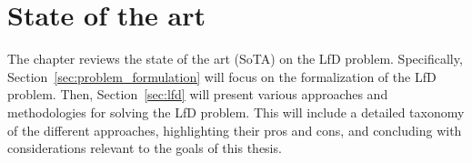 \section{State of the art}
The chapter reviews the state of the art (SoTA) on the LfD problem. Specifically, Section~\ref{sec:problem_formulation} will focus on the formalization of the LfD problem. Then, Section~\ref{sec:lfd} will present various approaches and methodologies for solving the LfD problem. This will include a detailed taxonomy of the different approaches, highlighting their pros and cons, and concluding with considerations relevant to the goals of this thesis.


